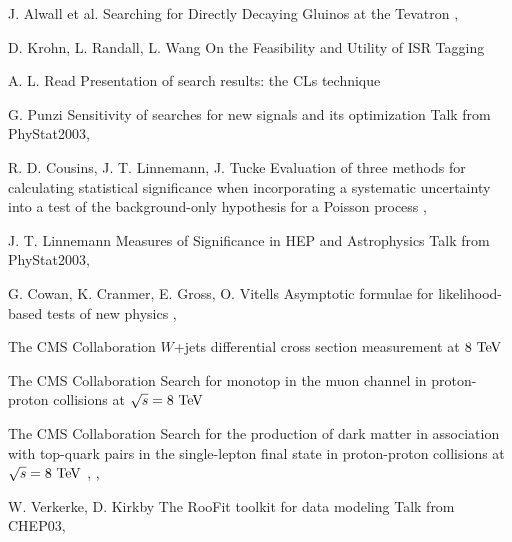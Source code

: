 {J. Alwall et al.}
{Searching for Directly Decaying Gluinos at the Tevatron}
{, }

{D. Krohn, L. Randall, L. Wang}
{On the Feasibility and Utility of ISR Tagging}
{}


{A. L. Read}
{Presentation of search results: the CLs technique}
{}

{G. Punzi}
{Sensitivity of searches for new signals and its optimization}
{Talk from PhyStat2003, }

{R. D. Cousins, J. T. Linnemann, J. Tucke}
{Evaluation of three methods for calculating
statistical significance when incorporating a
systematic uncertainty into a test of the
background-only hypothesis for a Poisson
process}
{, }

{J. T. Linnemann}
{Measures of Significance in HEP and Astrophysics}
{Talk from PhyStat2003, }

{G. Cowan, K. Cranmer, E. Gross, O. Vitells}
{Asymptotic formulae for likelihood-based tests of new physics}
{, }


{The CMS Collaboration}
{$W$+jets differential cross section measurement at $8~\text{TeV}$}
{}

{The CMS Collaboration}
{Search for monotop in the muon channel in proton-proton collisions at $\sqrt{s} = 8~\text{TeV}$}
{}

{The CMS Collaboration}
{Search for the production of dark matter in association with top-quark pairs
in the single-lepton final state in proton-proton collisions at $\sqrt{s} = 8~\text{TeV}$}
{, , }

{W. Verkerke, D. Kirkby}
{The RooFit toolkit for data modeling}
{Talk from CHEP03, }


